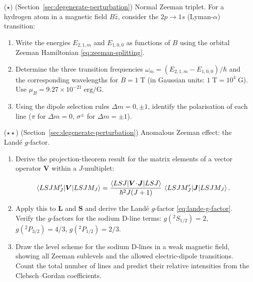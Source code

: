 \begin{problemset}
\item ($\star$) (Section~\ref{sec:degenerate-perturbation}) Normal Zeeman triplet. For a hydrogen atom in a magnetic field $B\hat{z}$, consider the $2p \to 1s$ (Lyman-$\alpha$) transition:
\begin{enumerate}
\item[(a)] Write the energies $E_{2,1,m}$ and $E_{1,0,0}$ as functions of $B$ using the orbital Zeeman Hamiltonian \eqref{eq:zeeman-splitting}.
\item[(b)] Determine the three transition frequencies $\omega_{m} = (E_{2,1,m}-E_{1,0,0})/\hbar$ and the corresponding wavelengths for $B = 1\;\text{T}$ (in Gaussian units: $1\;\text{T} = 10^{4}\;\text{G}$). Use $\mu_{B} = 9.27 \times 10^{-21}\;\text{erg/G}$.
\item[(c)] Using the dipole selection rules $\Delta m = 0,\pm 1$, identify the polarisation of each line ($\pi$ for $\Delta m=0$, $\sigma^{\pm}$ for $\Delta m=\pm 1$).
\end{enumerate}

\item ($\star\star$) (Section~\ref{sec:degenerate-perturbation}) Anomalous Zeeman effect: the Land\'e $g$-factor.
\begin{enumerate}
\item[(a)] Derive the projection-theorem result for the matrix elements of a vector operator $\bm V$ within a $J$-multiplet:
\begin{linenomath}
\begin{equation*}
\braket{LSJM_{J}'|\bm V|LSJM_{J}} = \frac{\braket{LSJ|\bm V\!\cdot\!\bm J|LSJ}}{\hbar^{2}J(J+1)}\,
\braket{LSJM_{J}'|\bm J|LSJM_{J}}.
\end{equation*}
\end{linenomath}
\item[(b)] Apply this to $\bm L$ and $\bm S$ and derive the Land\'e $g$-factor \eqref{eq:lande-g-factor}. Verify the $g$-factors for the sodium D-line terms: $g(^{2}S_{1/2})=2$, $g(^{2}P_{3/2})=4/3$, $g(^{2}P_{1/2})=2/3$.
\item[(c)] Draw the level scheme for the sodium D-lines in a weak magnetic field, showing all Zeeman sublevels and the allowed electric-dipole transitions. Count the total number of lines and predict their relative intensities from the Clebsch--Gordan coefficients.
\end{enumerate}


\end{problemset}
